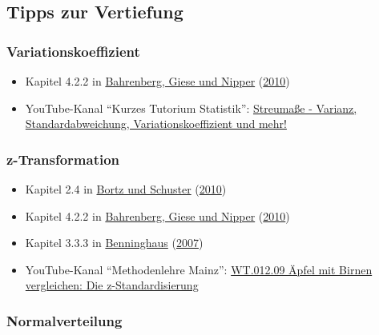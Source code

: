 \documentclass[
  ngerman,
]{article}
\providecommand{\tightlist}{%
  \setlength{\itemsep}{0pt}\setlength{\parskip}{0pt}}
\begin{document}
\hypertarget{tipps-zur-vertiefung-2}{%
\subsection{Tipps zur Vertiefung}\label{tipps-zur-vertiefung-2}}

\hypertarget{variationskoeffizient-1}{%
\subsubsection{Variationskoeffizient}\label{variationskoeffizient-1}}

\begin{itemize}
\tightlist
\item
  Kapitel 4.2.2 in \protect\hyperlink{ref-bahrenberg}{Bahrenberg, Giese und Nipper} (\protect\hyperlink{ref-bahrenberg}{2010})
\item
  YouTube-Kanal ``Kurzes Tutorium Statistik'': \href{https://www.youtube.com/watch?v=3oZrS3ZWVcA}{Streumaße - Varianz, Standardabweichung, Variationskoeffizient und mehr!}
\end{itemize}

\hypertarget{z-transformation-1}{%
\subsubsection{z-Transformation}\label{z-transformation-1}}

\begin{itemize}
\tightlist
\item
  Kapitel 2.4 in \protect\hyperlink{ref-bortz}{Bortz und Schuster} (\protect\hyperlink{ref-bortz}{2010})
\item
  Kapitel 4.2.2 in \protect\hyperlink{ref-bahrenberg}{Bahrenberg, Giese und Nipper} (\protect\hyperlink{ref-bahrenberg}{2010})
\item
  Kapitel 3.3.3 in \protect\hyperlink{ref-benninghaus}{Benninghaus} (\protect\hyperlink{ref-benninghaus}{2007})
\item
  YouTube-Kanal ``Methodenlehre Mainz'': \href{https://www.youtube.com/watch?v=AiucvUlIP8k}{WT.012.09 Äpfel mit Birnen vergleichen: Die z-Standardisierung}
\end{itemize}

\hypertarget{normalverteilung-1}{%
\subsubsection{Normalverteilung}\label{normalverteilung-1}}
\end{document}
